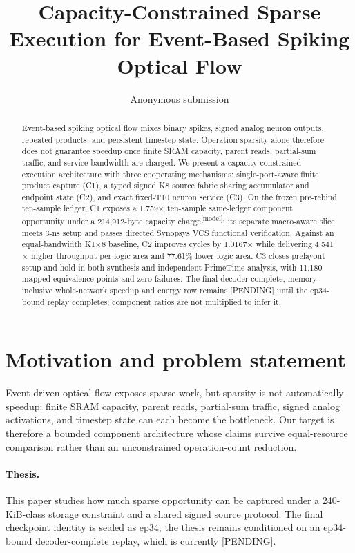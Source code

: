 \documentclass[9pt,twocolumn]{article}
\title{Capacity-Constrained Sparse Execution for Event-Based Spiking Optical Flow}
\author{Anonymous submission}
\date{}
\newcommand{\modeltag}{\textsuperscript{[model]}}
\newcommand{\pending}{\textcolor{red!70!black}{[PENDING]}}
\begin{document}
\maketitle

\begin{abstract}
Event-based spiking optical flow mixes binary spikes, signed analog neuron
outputs, repeated products, and persistent timestep state.  Operation sparsity
alone therefore does not guarantee speedup once finite SRAM capacity, parent
reads, partial-sum traffic, and service bandwidth are charged.  We present a
capacity-constrained execution architecture with three cooperating mechanisms:
single-port-aware finite product capture (C1), a typed signed K8 source fabric
sharing accumulator and endpoint state (C2), and exact fixed-T10 neuron service
(C3).  On the frozen pre-rebind ten-sample ledger, C1 exposes a
1.759$\times$ ten-sample
same-ledger component opportunity under a 214,912-byte capacity charge\modeltag;
its separate macro-aware slice meets 3-ns setup and passes directed Synopsys VCS
functional verification.  Against an equal-bandwidth K1$\times$8 baseline, C2
improves cycles by 1.0167$\times$ while delivering 4.541$\times$ higher
throughput per logic area and 77.61\% lower logic area.  C3 closes prelayout
setup and hold in both synthesis and independent PrimeTime analysis, with 11,180
mapped equivalence points and zero failures.  The final decoder-complete,
memory-inclusive whole-network speedup and energy row remains \pending{} until
the ep34-bound replay completes; component ratios are not multiplied to infer it.
\end{abstract}

\section{Motivation and problem statement}
Event-driven optical flow exposes sparse work, but sparsity is not automatically
speedup: finite SRAM capacity, parent reads, partial-sum traffic, signed analog
activations, and timestep state can each become the bottleneck.  Our target is
therefore a bounded component architecture whose claims survive equal-resource
comparison rather than an unconstrained operation-count reduction.

\paragraph{Thesis.}
This paper studies how much sparse opportunity can be captured under a
240-KiB-class storage constraint and a shared signed source protocol.  The final
checkpoint identity is sealed as ep34; the thesis remains conditioned on an
ep34-bound decoder-complete replay, which is currently \pending.
\end{document}
